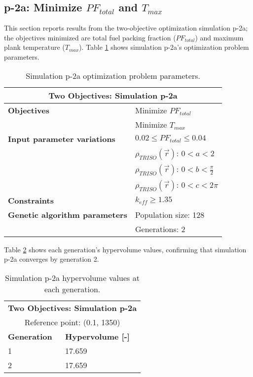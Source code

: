 \subsection{p-2a: Minimize $PF_{total}$ and $T_{max}$}
\label{sec:p-2a}
This section reports results from the two-objective optimization simulation p-2a; the 
objectives minimized are total fuel packing fraction ($PF_{total}$) and maximum plank
temperature ($T_{max}$).  
Table \ref{tab:simulationp2a} shows simulation p-2a's optimization problem parameters.
\begin{table}[htbp!]
    \centering
    \onehalfspacing
    \caption{Simulation p-2a optimization problem parameters.}
	\label{tab:simulationp2a}
    \footnotesize
    \begin{tabular}{l|p{4cm}}
    \hline 
    \multicolumn{2}{c}{\textbf{Two Objectives: Simulation p-2a}} \\
    \hline 
    \textbf{Objectives} & Minimize $PF_{total}$ \\
    & Minimize $T_{max}$ \\
    \hline 
    \textbf{Input parameter variations} & $0.02 \leq PF_{total} \leq 0.04$ \\
    & $\rho_{TRISO}(\vec{r})$: $0<a<2$ \\
    & $\rho_{TRISO}(\vec{r})$: $0<b<\frac{\pi}{2}$ \\
    & $\rho_{TRISO}(\vec{r})$: $0<c<2\pi$ \\
    \hline
    \textbf{Constraints} & $k_{eff} \geq 1.35$\\ 
    \hline 
    \textbf{Genetic algorithm parameters} & Population size: 128 \\
    & Generations: 2 \\
    \hline
    \end{tabular}
\end{table}

Table \ref{tab:p2a-hypervolume} shows each generation's hypervolume values, 
confirming that simulation p-2a converges by generation 2. 
\begin{table}[htbp!]
    \centering
    \onehalfspacing
    \caption{Simulation p-2a hypervolume values at each generation.}
	\label{tab:p2a-hypervolume}
    \footnotesize
    \begin{tabular}{ll}
    \hline 
    \multicolumn{2}{c}{\textbf{Two Objectives: Simulation p-2a}} \\
    \multicolumn{2}{c}{Reference point: (0.1, 1350)} \\
    \hline 
    \textbf{Generation} & \textbf{Hypervolume [-]} \\
    \hline
    1 & 17.659 \\
    2 & 17.659 \\
    \hline
    \end{tabular}
\end{table}

